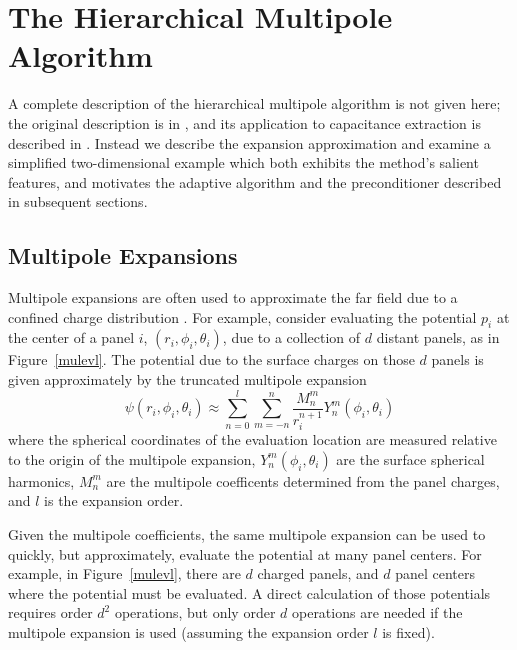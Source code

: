 \section{The Hierarchical Multipole Algorithm}
\label{mutapp}

A complete description of the hierarchical multipole
algorithm is not given here; the original description is 
in \cite{greeng87,greeng88}, and
its application to capacitance extraction is described in
\cite{nabors91}.  Instead we describe the expansion approximation
and examine a simplified two-dimensional example which both exhibits
the method's salient features, and motivates the adaptive algorithm
and the preconditioner described in subsequent sections.

\subsection{Multipole Expansions}

Multipole expansions are often used to approximate the far field due to
a confined charge distribution \cite{jackso75}. 
For example, consider evaluating the
potential $p_i$ at the center of a panel $i$, 
$(r_i, \phi_i , \theta_i )$, due to
a collection of $ d $ distant panels, as in Figure~\ref{mulevl}.  The
potential due to the surface charges on those $ d $ panels is given
approximately by the truncated multipole expansion
\begin{equation}
\psi(r_i, \phi_i , \theta_i ) \approx \sum_{n=0}^{l} \sum_{m=-n}^{n}
\frac{M^m_n}{r_i^{n+1}} Y^m_n(\phi_i , \theta_i )
\label{eq:multi}
\end{equation}
where the spherical coordinates
of the evaluation location are measured relative to
the origin of the multipole expansion, $ Y^m_n (\phi_i , \theta_i ) $ 
are the surface spherical harmonics, $ M^m_n $ are the multipole coefficents
determined from the panel charges, and $ l $ is the expansion order.

Given the multipole coefficients, the same multipole expansion can be
used to quickly, but approximately, evaluate the potential at many
panel centers. For example, in Figure~\ref{mulevl}, there are $ d $
charged panels, and $d$ panel centers where the potential must be
evaluated. A direct calculation of those potentials requires order
$d^2$ operations, but only order $d$ operations are needed if the
multipole expansion is used (assuming the expansion order $ l $ is fixed).

